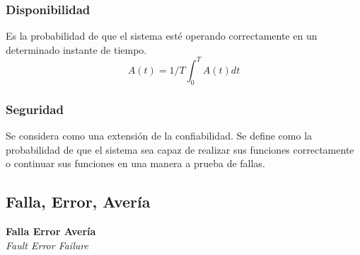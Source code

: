 \begin{frame}
	\frametitle{Disponibilidad}
	Es la probabilidad de que el sistema esté operando correctamente en un determinado instante de tiempo. 
	\LARGE
	$$
	A(t) = 1/T \int_0^T{A(t) dt}
	$$
\end{frame}

\begin{frame}
	\frametitle{Seguridad}
	Se considera como una extensión de la confiabilidad. Se define como la probabilidad de que el sistema sea capaz de realizar sus funciones correctamente o continuar sus funciones en una manera a prueba de fallas. 
\end{frame}

\subsection{Falla, Error, Avería}
\begin{frame}[c]
	\begin{center}
		\LARGE
		\textbf{Falla \textrightarrow Error \textrightarrow Avería}\\
		\textit{Fault \textrightarrow Error \textrightarrow Failure}
	\end{center}
\end{frame}
